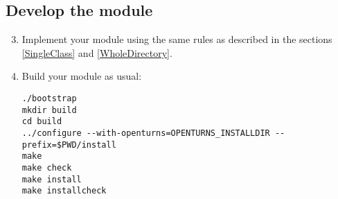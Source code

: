 \documentclass[11pt]{article}
\begin{document}
\subsection{Develop the module}
\begin{enumerate}
  \setcounter{enumi}{2}
\item Implement your module using the same rules as described in the sections \ref{SingleClass} and \ref{WholeDirectory}.
\item Build your module as usual:
\begin{verbatim}
./bootstrap
mkdir build
cd build
../configure --with-openturns=OPENTURNS_INSTALLDIR --prefix=$PWD/install
make
make check
make install
make installcheck
\end{verbatim}
\end{enumerate}
\end{document}
